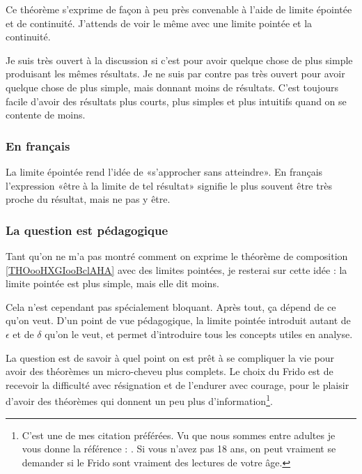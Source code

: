 Ce théorème s'exprime de façon à peu près convenable à l'aide de limite épointée et de continuité. J'attends de voir le même avec une limite pointée et la continuité.

Je suis très ouvert à la discussion si c'est pour avoir quelque chose de plus simple produisant les mêmes résultats. Je ne suis par contre pas très ouvert pour avoir quelque chose de plus simple, mais donnant moins de résultats. C'est toujours facile d'avoir des résultats plus courts, plus simples et plus intuitifs quand on se contente de moins.

\subsubsection{En français}

La limite épointée rend l'idée de «s'approcher sans atteindre». En français l'expression «être à la limite de tel résultat» signifie le plus souvent être très proche du résultat, mais ne pas y être.

\subsubsection{La question est pédagogique}

Tant qu'on ne m'a pas montré comment on exprime le théorème de composition \ref{THOooHXGIooBclAHA} avec des limites pointées, je resterai sur cette idée : la limite pointée est plus simple, mais elle dit moins.

Cela n'est cependant pas spécialement bloquant. Après tout, ça dépend de ce qu'on veut. D'un point de vue pédagogique, la limite pointée introduit autant de \( \epsilon\) et de \( \delta\) qu'on le veut, et permet d'introduire tous les concepts utiles en analyse.

La question est de savoir à quel point on est prêt à se compliquer la vie pour avoir des théorèmes un micro-cheveu plus complets. Le choix du Frido est de recevoir la difficulté avec résignation et de l'endurer avec courage, pour le plaisir d'avoir des théorèmes qui donnent un peu plus d'information\footnote{C'est une de mes citation préférées. Vu que nous sommes entre adultes je vous donne la référence : \cite{BIBooTOVWooSDsNrc}. Si vous n'avez pas 18 ans, on peut vraiment se demander si le Frido sont vraiment des lectures de votre âge.}.


